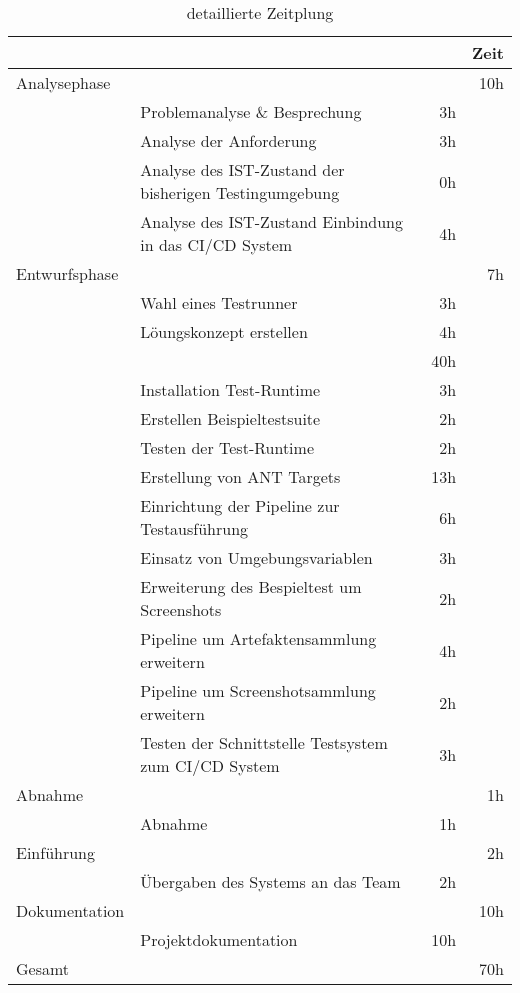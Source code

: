 \begin{table}[h]
\begin{tabular}{llrr}
\rowcolor{gragreen}\multicolumn{1}{l}{\bf{Projektphase}} & \multicolumn{1}{l}{ } & \multicolumn{1}{l}{\bf{ }} & \multicolumn{1}{l}{\bf{Zeit}} \\
\hline
\rowcolor{heading}Analysephase &  &  & 10h \\
 & Problemanalyse \& Besprechung & 3h &  \\
\rowcolor{odd} & Analyse der Anforderung & 3h &  \\
& Analyse des IST-Zustand der bisherigen Testingumgebung & 0h &  \\
 \rowcolor{odd}& Analyse des IST-Zustand Einbindung in das CI/CD System & 4h &  \\
\rowcolor{heading}Entwurfsphase &  &  & 7h \\
 & Wahl eines Testrunner & 3h &  \\
 \rowcolor{odd} & Löungskonzept erstellen & 4h &  \\
\rowcolor{heading}\multicolumn{2}{l}{Implementierungsphase}   &  & 40h \\
 & Installation Test-Runtime & 3h &  \\
 \rowcolor{odd}& Erstellen Beispieltestsuite & 2h &  \\
 & Testen der Test-Runtime & 2h &  \\
\rowcolor{odd} & Erstellung von ANT Targets & 13h &  \\
 & Einrichtung der Pipeline zur Testausführung & 6h &  \\
\rowcolor{odd} & Einsatz von Umgebungsvariablen & 3h &  \\
 & Erweiterung des Bespieltest um Screenshots & 2h &  \\
\rowcolor{odd} & Pipeline um Artefaktensammlung erweitern & 4h &  \\
 & Pipeline um Screenshotsammlung erweitern & 2h &  \\
\rowcolor{odd} & Testen der Schnittstelle Testsystem zum CI/CD System & 3h &  \\
\rowcolor{heading}Abnahme &  &  & 1h \\
 & Abnahme & 1h &  \\
\rowcolor{heading}Einführung &  &  & 2h \\
 & Übergaben des Systems an das Team & 2h &  \\
\rowcolor{heading}Dokumentation &  &  & 10h \\
 & Projektdokumentation & 10h & \\
\hline
\rowcolor{heading}Gesamt &  &  & 70h
\end{tabular}
\caption{detaillierte Zeitplung}
\label{table:detailtimetable}
\end{table}